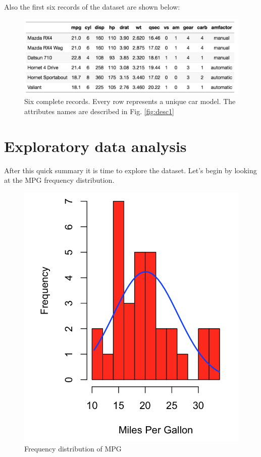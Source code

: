Also the first six records of the dataset are shown below:

\begin{figure}[ht]
	\begin{center}
			\includegraphics[scale=0.5]{Parts/numerics/desc2}
	\end{center}
	\caption{Six complete records. Every row represents a unique car model. The attributes names are described in Fig. \ref{fig:desc1}}
	\label{fig:desc2}
\end{figure}

\section{Exploratory data analysis}\label{ExpDA}

After this quick summary it is time to explore the dataset. Let's begin by looking at the MPG frequency distribution. \newpage

\begin{figure}[ht]
	\begin{center}
			\includegraphics[scale=0.5]{Parts/numerics/hist1}
	\end{center}
	\caption{Frequency distribution of MPG}
	\label{fig:hist1}
\end{figure}

